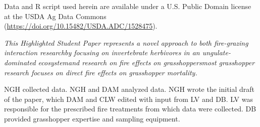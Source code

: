 \documentclass[referee, 
	            sn-basic]
           {sn-jnl}
\begin{document}
\begin{linenumbers}

Data and \textsf{R} script used herein are available under a U.S. Public Domain license at the USDA Ag Data Commons (\href{doi.org/10.15482/USDA.ADC/1528475}{https://doi.org/10.15482/USDA.ADC/1528475}). 


\emph{This Highlighted Student Paper represents a novel approach to both fire-grazing interaction research\textemdash by focusing on invertebrate herbivores in an ungulate-dominated ecosystem\textemdash and research on fire effects on grasshoppers\textemdash most grasshopper research focuses on direct fire effects on grasshopper mortality.} 

NGH collected data. 
NGH and DAM analyzed data. 
NGH wrote the initial draft of the paper, which DAM and CLW edited with input from LV and DB.
LV was responsible for the prescribed fire treatments from which data were collected. 
DB provided grasshopper expertise and sampling equipment.



\end{linenumbers}
\end{document}
